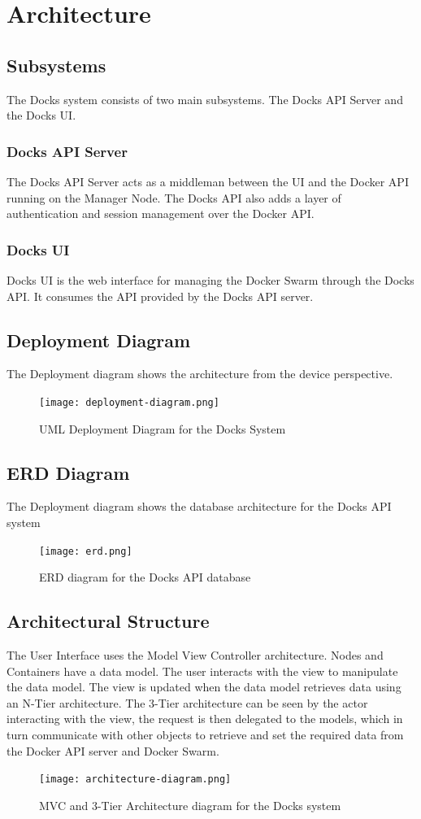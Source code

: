 \documentclass[]{article}
\begin{document}
\section{Architecture}
\subsection{Subsystems}
The Docks system consists of two main subsystems. The Docks API Server and the Docks UI.

\subsubsection{Docks API Server}
The Docks API Server acts as a middleman between the UI and the Docker API running on the Manager Node. The Docks API also adds a layer of authentication and session management over the Docker API.

\subsubsection{Docks UI}
Docks UI is the web interface for managing the Docker Swarm through the Docks API. It consumes the API provided by the Docks API server.


\subsection{Deployment Diagram}
The Deployment diagram shows the architecture from the device perspective.

\begin{figure}[H]
	\centering
	\texttt{[image: deployment-diagram.png]}
	\caption{UML Deployment Diagram for the Docks System}
\end{figure}

\subsection{ERD Diagram}
The Deployment diagram shows the database architecture for the Docks API system

\begin{figure}[H]
	\centering
	\texttt{[image: erd.png]}
	\caption{ERD diagram for the Docks API database}
\end{figure}

\subsection{Architectural Structure}
The User Interface uses the Model View Controller architecture. Nodes and Containers have a data model. The user interacts with the view to manipulate the data model. The view is updated when the data model retrieves data using an N-Tier architecture. The 3-Tier architecture can be seen by the actor interacting with the view, the request is then delegated to the models, which in turn communicate with other objects to retrieve and set the required data from the Docker API server and Docker Swarm.

\begin{figure}[h]
	\centering
	\texttt{[image: architecture-diagram.png]}
	\caption{MVC and 3-Tier Architecture diagram for the Docks system}
\end{figure}
\end{document}
